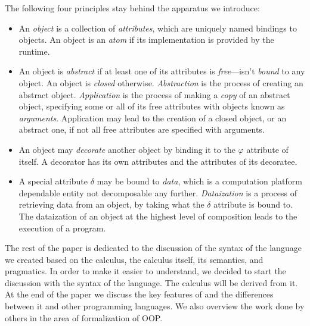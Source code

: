 The following four principles stay behind the
apparatus we introduce:

\begin{itemize}
\item An \emph{object} is a collection of \emph{attributes},
which are uniquely named bindings to objects. An object
is an \emph{atom} if its implementation is provided by the runtime.

\item An object is \emph{abstract} if at least one of its attributes
is \emph{free}---isn't \emph{bound} to any object. An object
is \emph{closed} otherwise.
\emph{Abstraction} is the process of creating an abstract object.
\emph{Application} is the process of making a \emph{copy} of an abstract
object, specifying some or all of its free attributes with
objects known as \emph{arguments}. Application may lead to the
creation of a closed object, or an abstract one, if not all free
attributes are specified with arguments.

\item An object may \emph{decorate} another object by binding it
to the $\varphi$ attribute of itself. A decorator has its
own attributes and the attributes of its decoratee.

\item A special attribute $\delta$ may be bound to \emph{data},
which is a computation platform dependable entity not
decomposable any further.
\emph{Dataization} is a process of retrieving data from an object,
by taking what the $\delta$ attribute is bound to.
The dataization of an object at the highest level of composition
leads to the execution of a program.
\end{itemize}

The rest of the paper is dedicated to the discussion of the
syntax of the language we created based on the calculus,
the calculus itself, its semantics, and pragmatics.
In order to make it easier to understand, we decided to start
the discussion with the syntax of the language. The calculus
will be derived from it. At the end of the paper we discuss the
key features of \eo{} and the differences between it and other
programming languages.
We also overview the work done by others in the area of
formalization of OOP.


